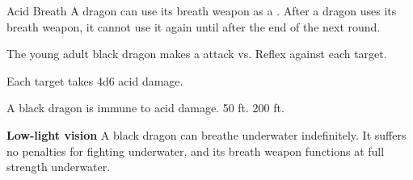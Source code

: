     \begin{freeability}{Acid Breath}
      A dragon can use its breath weapon as a .
      After a dragon uses its breath weapon, it cannot use it again until after the end of the next round.
      \par The young adult black dragon makes a  attack
        vs. Reflex against each target.
    
    \hit Each target takes 4d6 acid damage.
    \end{freeability}
  
      
       A black dragon is immune to acid damage.
     50 ft.
     200 ft.
    \par\noindent\textbf{Low-light vision}
        A black dragon can breathe underwater indefinitely.
        It suffers no penalties for fighting underwater, and its breath weapon functions at full strength underwater.
  

